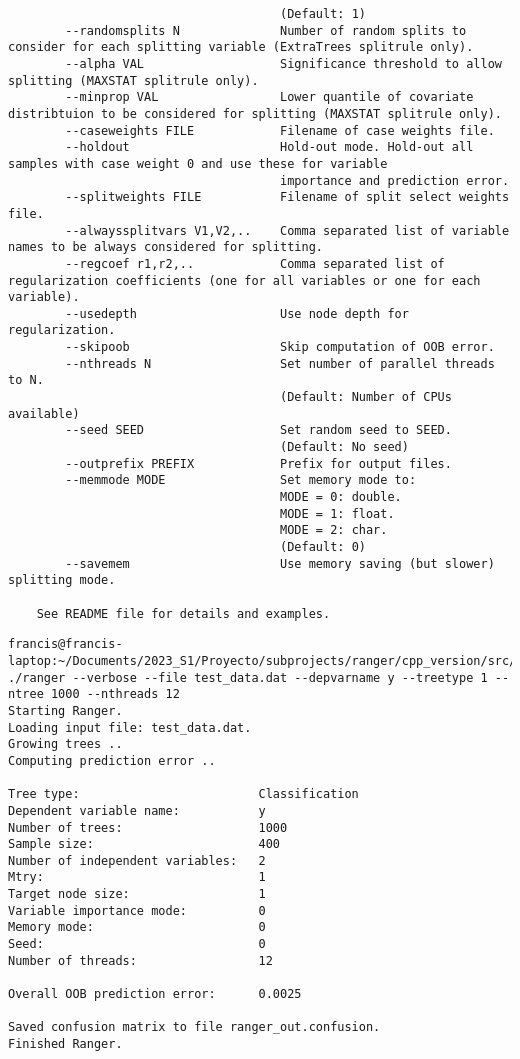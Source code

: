 \documentclass[12pt,oneside]{book}
\begin{document}
\begin{lstlisting}
                                      (Default: 1)
        --randomsplits N              Number of random splits to consider for each splitting variable (ExtraTrees splitrule only).
        --alpha VAL                   Significance threshold to allow splitting (MAXSTAT splitrule only).
        --minprop VAL                 Lower quantile of covariate distribtuion to be considered for splitting (MAXSTAT splitrule only).
        --caseweights FILE            Filename of case weights file.
        --holdout                     Hold-out mode. Hold-out all samples with case weight 0 and use these for variable 
                                      importance and prediction error.
        --splitweights FILE           Filename of split select weights file.
        --alwayssplitvars V1,V2,..    Comma separated list of variable names to be always considered for splitting.
        --regcoef r1,r2,..            Comma separated list of regularization coefficients (one for all variables or one for each variable).
        --usedepth                    Use node depth for regularization.
        --skipoob                     Skip computation of OOB error.
        --nthreads N                  Set number of parallel threads to N.
                                      (Default: Number of CPUs available)
        --seed SEED                   Set random seed to SEED.
                                      (Default: No seed)
        --outprefix PREFIX            Prefix for output files.
        --memmode MODE                Set memory mode to:
                                      MODE = 0: double.
                                      MODE = 1: float.
                                      MODE = 2: char.
                                      (Default: 0)
        --savemem                     Use memory saving (but slower) splitting mode.
    
    See README file for details and examples.
  \end{lstlisting}

  \begin{lstlisting}
francis@francis-laptop:~/Documents/2023_S1/Proyecto/subprojects/ranger/cpp_version/src/build$ ./ranger --verbose --file test_data.dat --depvarname y --treetype 1 --ntree 1000 --nthreads 12
Starting Ranger.
Loading input file: test_data.dat.
Growing trees ..
Computing prediction error ..

Tree type:                         Classification
Dependent variable name:           y
Number of trees:                   1000
Sample size:                       400
Number of independent variables:   2
Mtry:                              1
Target node size:                  1
Variable importance mode:          0
Memory mode:                       0
Seed:                              0
Number of threads:                 12

Overall OOB prediction error:      0.0025

Saved confusion matrix to file ranger_out.confusion.
Finished Ranger.
  \end{lstlisting}
\end{document}
